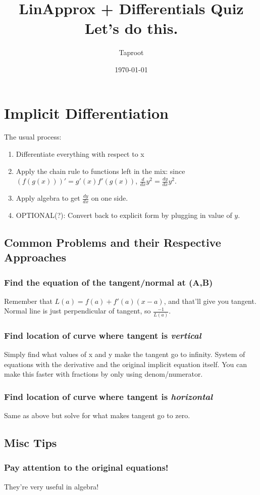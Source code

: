 \documentclass[letterpaper]{article}
\author{Taproot}
\date{\today}
\title{LinApprox + Differentials Quiz\\\medskip
\large Let's do this.}
\renewcommand{\tableofcontents}{}
\begin{document}
\tableofcontents


\section{Implicit Differentiation}
\label{sec:orgdcc1e2a}
The usual process:
\begin{enumerate}
\item Differentiate everything with respect to x
\item Apply the chain rule to functions left in the mix: since \((f(g(x)))' = g'(x) f'(g(x))\), \(\frac{d}{dx}y^2 =  \frac{dy}{dx}y^2\).
\item Apply algebra to get \(\frac{dy}{dx}\) on one side.
\item OPTIONAL(?): Convert back to explicit form by plugging in value of \(y\).
\end{enumerate}

\subsection{Common Problems and their Respective Approaches}
\label{sec:org04c6d5c}
\subsubsection{Find the equation of the tangent/normal at (A,B)}
\label{sec:org0f886af}
Remember that \(L(a) = f(a) + f'(a)(x-a)\), and that'll give you tangent.
Normal line is just perpendicular of tangent, so \(\frac{-1}{L(a)}\).
\subsubsection{Find location of curve where tangent is \emph{vertical}}
\label{sec:org2e01fe1}
Simply find what values of x and y make the tangent go to infinity.
System of equations with the derivative and the original implicit equation itself. You can make this faster with fractions by only using denom/numerator.
\subsubsection{Find location of curve where tangent is \emph{horizontal}}
\label{sec:org33757b0}
Same as above but solve for what makes tangent go to zero.
\subsection{Misc Tips}
\label{sec:org9ee3e66}
\subsubsection{Pay attention to the original equations!}
\label{sec:org087317d}
They're very useful in algebra!
\end{document}
